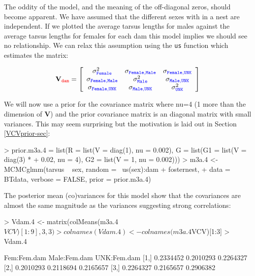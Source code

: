 \documentclass{article}
\begin{document}
The oddity of the model, and the meaning of the off-diagonal zeros, should become apparent. We have assumed that the different sexes with in a nest are independent. If we plotted the average tarsus lengths for males against the average tarsus lengths for females for each dam this model implies we should see no relationship. We can relax this assumption using the \texttt{us} function which estimates the matrix: 

\begin{displaymath}
{\bf V}_{{\color{red} \texttt{dam}}}=
\left[
\begin{array}{ccc}
\sigma^{2}_{\color{blue}\texttt{Female}}&\sigma_{\color{blue}\texttt{Female}, \texttt{Male}}&\sigma_{\color{blue}\texttt{Female}, \texttt{UNK}}\\
\sigma_{\color{blue}\texttt{Female}, \texttt{Male}}&\sigma^{2}_{\color{blue}\texttt{Male}}&\sigma_{\color{blue}\texttt{Male}, \texttt{UNK}}\\
\sigma_{\color{blue}\texttt{Female}, \texttt{UNK}}&\sigma_{\color{blue}\texttt{Male}, \texttt{UNK}}&\sigma^{2}_{\color{blue}\texttt{UNK}}\\
\end{array}
\right]
\end{displaymath}

We will now use a prior for the covariance matrix where nu=4 (1 more than the dimension of {\bf V}) and the prior covariance matrix is an diagonal matrix with small variances. This may seem surprising but the motivation is laid out in Section \ref{VCVprior-sec}: 

\begin{Schunk}
\begin{Sinput}
> prior.m3a.4 = list(R = list(V = diag(1), nu = 0.002), G = list(G1 = list(V = diag(3) * 
+     0.02, nu = 4), G2 = list(V = 1, nu = 0.002)))
> m3a.4 <- MCMCglmm(tarsus ~ sex, random = ~us(sex):dam + fosternest, 
+     data = BTdata, verbose = FALSE, prior = prior.m3a.4)
\end{Sinput}
\end{Schunk}

The posterior mean (co)variances for this model show that the covariances are almost the same magnitude as the variances suggesting strong correlations: 

\begin{Schunk}
\begin{Sinput}
> Vdam.4 <- matrix(colMeans(m3a.4$VCV)[1:9], 3, 3)
> colnames(Vdam.4) <- colnames(m3a.4$VCV)[1:3]
> Vdam.4
\end{Sinput}
\begin{Soutput}
     Fem:Fem.dam Male:Fem.dam UNK:Fem.dam
[1,]   0.2334452    0.2010293   0.2264327
[2,]   0.2010293    0.2118694   0.2165657
[3,]   0.2264327    0.2165657   0.2906382
\end{Soutput}
\end{Schunk}
\end{document}
